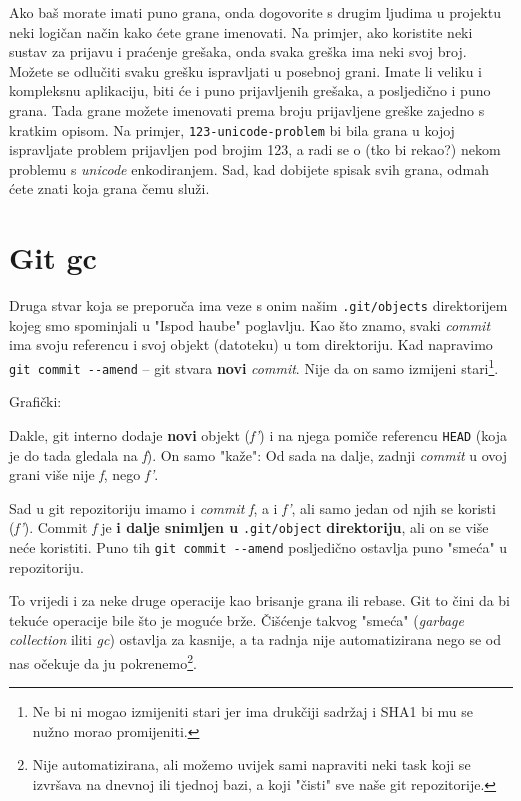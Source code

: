 Ako baš morate imati puno grana, onda dogovorite s drugim ljudima u projektu neki logičan način kako ćete grane imenovati.
Na primjer, ako koristite neki sustav za prijavu i praćenje grešaka, onda svaka greška ima neki svoj broj.
Možete se odlučiti svaku grešku ispravljati u posebnoj grani. 
Imate li veliku i kompleksnu aplikaciju, biti će i puno prijavljenih grešaka, a posljedično i puno grana.
Tada grane možete imenovati prema broju prijavljene greške zajedno s kratkim opisom.
Na primjer, \verb+123-unicode-problem+ bi bila grana u kojoj ispravljate problem prijavljen pod brojim 123, a radi se o (tko bi rekao?) nekom problemu s \emph{unicode} enkodiranjem.
Sad, kad dobijete spisak svih grana, odmah ćete znati koja grana čemu služi.

\section*{Git gc}

Druga stvar koja se preporuča ima veze s onim našim \verb+.git/objects+ direktorijem kojeg smo spominjali u "Ispod haube" poglavlju.
Kao što znamo, svaki \emph{commit} ima svoju referencu i svoj objekt (datoteku) u tom direktoriju.
Kad napravimo \verb+git commit --amend+ -- git stvara \textbf{novi} \emph{commit}.
Nije da on samo izmijeni stari\footnote{Ne bi ni mogao izmijeniti stari jer ima drukčiji sadržaj i SHA1 bi mu se nužno morao promijeniti.}.

Grafički:



Dakle, git interno dodaje \textbf{novi} objekt (\emph{f'}) i na njega pomiče referencu \verb+HEAD+ (koja je do tada gledala na \emph f).
On samo "kaže": Od sada na dalje, zadnji \emph{commit} u ovoj grani više nije \emph f, nego \emph{f'}.

Sad u git repozitoriju imamo i \emph{commit} \emph f, a i \emph{f'}, ali samo jedan od njih se koristi (\emph{f'}).
Commit \emph f je \textbf{i dalje snimljen u} \verb+.git/object+ \textbf{direktoriju}, ali on se više neće koristiti.
Puno tih \verb+git commit --amend+ posljedično ostavlja puno "smeća" u repozitoriju.

To vrijedi i za neke druge operacije kao brisanje grana ili rebase.
Git to čini da bi tekuće operacije bile što je moguće brže.
Čišćenje takvog "smeća" (\emph{garbage collection} iliti \emph{gc}) ostavlja za kasnije, a ta radnja nije automatizirana nego se od nas očekuje da ju pokrenemo\footnote{Nije automatizirana, ali možemo uvijek sami napraviti neki task koji se izvršava na dnevnoj ili tjednoj bazi, a koji "čisti" sve naše git repozitorije.}.

